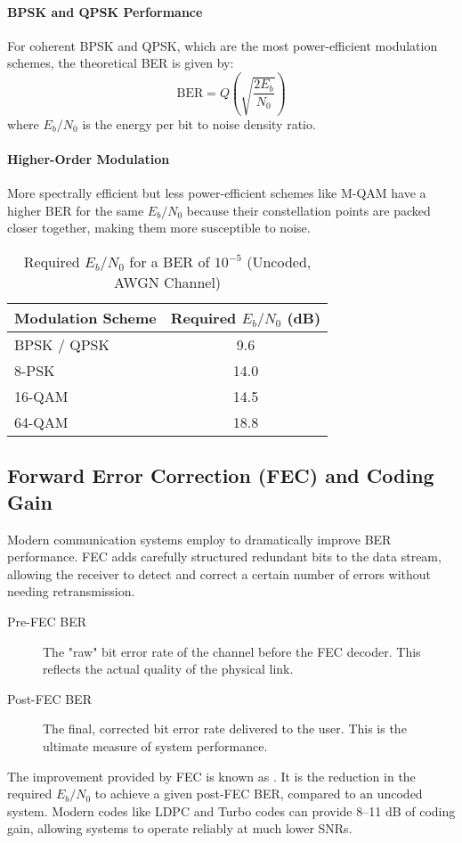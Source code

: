 \paragraph{BPSK and QPSK Performance}
For coherent BPSK and QPSK, which are the most power-efficient modulation schemes, the theoretical BER is given by:
\begin{equation}
    \text{BER} = Q\left(\sqrt{\frac{2E_b}{N_0}}\right)
\end{equation}
where $E_b/N_0$ is the energy per bit to noise density ratio.

\paragraph{Higher-Order Modulation}
More spectrally efficient but less power-efficient schemes like M-QAM have a higher BER for the same $E_b/N_0$ because their constellation points are packed closer together, making them more susceptible to noise.

\begin{table}[H]
    \centering
    \caption{Required $E_b/N_0$ for a BER of $10^{-5}$ (Uncoded, AWGN Channel)}
    \label{tab:ber-reqs-uncoded}
    \begin{tabular}{@{}lc@{}}
        \toprule
        \tableheaderfont Modulation Scheme & \tableheaderfont Required $E_b/N_0$ (dB) \\
        \midrule
        BPSK / QPSK & 9.6 \\
        8-PSK & 14.0 \\
        16-QAM & 14.5 \\
        64-QAM & 18.8 \\
        \bottomrule
    \end{tabular}
\end{table}


\subsection{Forward Error Correction (FEC) and Coding Gain}

Modern communication systems employ  to dramatically improve BER performance. FEC adds carefully structured redundant bits to the data stream, allowing the receiver to detect and correct a certain number of errors without needing retransmission.
\begin{description}
    \item[Pre-FEC BER] The "raw" bit error rate of the channel before the FEC decoder. This reflects the actual quality of the physical link.
    \item[Post-FEC BER] The final, corrected bit error rate delivered to the user. This is the ultimate measure of system performance.
\end{description}
The improvement provided by FEC is known as . It is the reduction in the required $E_b/N_0$ to achieve a given post-FEC BER, compared to an uncoded system. Modern codes like LDPC and Turbo codes can provide 8--11 dB of coding gain, allowing systems to operate reliably at much lower SNRs.

